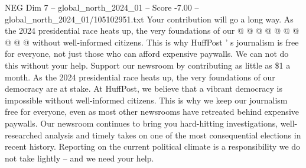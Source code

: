 \begin{textsample}{NEG Dim 7 – global\_north\_2024\_01 – Score -7.00 – global\_north\_2024\_01/105102951.txt}
Your contribution will go a long way.
As the 2024 presidential race heats up, the very foundations of our @ @ @ @ @ @ @ @ @ @ without well-informed citizens.
This is why HuffPost ' s journalism is free for everyone, not just those who can afford expensive paywalls.
We can not do this without your help.
Support our newsroom by contributing as little as \$1 a month.
As the 2024 presidential race heats up, the very foundations of our democracy are at stake.
At HuffPost, we believe that a vibrant democracy is impossible without well-informed citizens.
This is why we keep our journalism free for everyone, even as most other newsrooms have retreated behind expensive paywalls.
Our newsroom continues to bring you hard-hitting investigations, well-researched analysis and timely takes on one of the most consequential elections in recent history.
Reporting on the current political climate is a responsibility we do not take lightly -- and we need your help.

\end{textsample}
